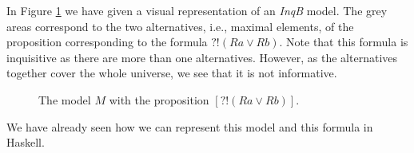 In Figure \ref{fig:Example Model} we have given a visual representation of an \textit{InqB} model. The grey areas correspond to the two alternatives, i.e., maximal elements, of the proposition corresponding to the formula $?!(Ra \lor Rb)$. Note that this formula is inquisitive as there are more than one alternatives. However, as the alternatives together cover the whole universe, we see that it is not informative.

\begin{figure}[h]
    \centering
    \caption{The model $M$ with the proposition $[?!(Ra \lor Rb)]$.}
    \label{fig:Example Model}
\end{figure}

We have already seen how we can represent this model and this formula in Haskell. 
